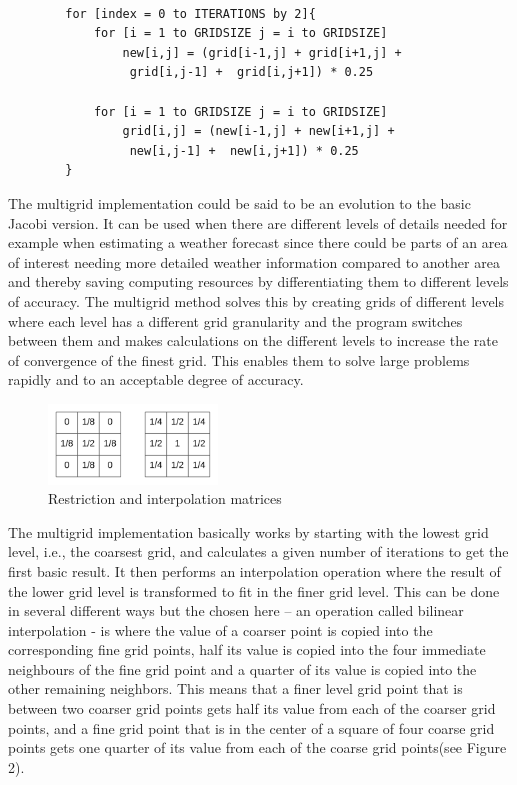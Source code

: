 \documentclass{article}
\begin{document}
\begin{verbatim}

        for [index = 0 to ITERATIONS by 2]{
            for [i = 1 to GRIDSIZE j = i to GRIDSIZE]
                new[i,j] = (grid[i-1,j] + grid[i+1,j] +
                 grid[i,j-1] +  grid[i,j+1]) * 0.25
	
            for [i = 1 to GRIDSIZE j = i to GRIDSIZE]
                grid[i,j] = (new[i-1,j] + new[i+1,j] + 
                 new[i,j-1] +  new[i,j+1]) * 0.25
        }

\end{verbatim}


The multigrid implementation could be said to be an evolution to the basic Jacobi version. It can be used when there are different levels of details needed for example when estimating a weather forecast since there could be parts of an area of interest needing more detailed weather information compared to another area and thereby saving computing resources by differentiating them to different levels of accuracy. The multigrid method solves this by creating grids of different levels where each level has a different grid granularity and the program switches between them and makes calculations on the different levels to increase the rate of convergence of the finest grid. This enables them to solve large problems rapidly and to an acceptable degree of accuracy.

\begin{figure}
    \includegraphics[width=0.4\textwidth]{../images/lvloperations.png}
    \caption{Restriction and interpolation matrices}
    \label{fig:basic}
\end{figure}

The multigrid implementation basically works by starting with the lowest grid level, i.e., the coarsest grid, and calculates a given number of iterations to get the first basic result. It then performs an interpolation operation where the result of the lower grid level is transformed to fit in the finer grid level. This can be done in several different ways but the chosen here – an operation called bilinear interpolation - is where the value of a coarser point is copied into the corresponding fine grid points, half its value is copied into the four immediate neighbours of the fine grid point and a quarter of its value is copied into the other remaining neighbors. This means that a finer level grid point that is between two coarser grid points gets half its value from each of the coarser grid points, and a fine grid point that is in the center of a square of four coarse grid points gets one quarter of its value from each of the coarse grid points(see Figure 2).
\end{document}
